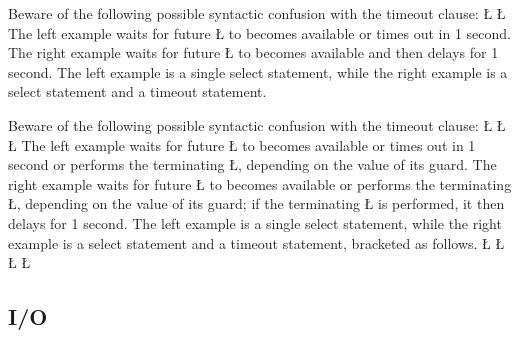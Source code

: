 \documentclass[openright,twoside]{report}
\begin{document}
\begin{annotation}
 Beware of the following possible syntactic confusion with the timeout clause:
\LGinlinefalse\LGbegin\lgrinde
\L{}
\L{}
\endlgrinde\LGend
The left example waits for future \LGinlinetrue\LGbegin\lgrinde\L{}\endlgrinde\LGend{} to becomes available or times out in 1 second.
The right example waits for future \LGinlinetrue\LGbegin\lgrinde\L{}\endlgrinde\LGend{} to becomes available and then delays for 1 second.
The left example is a single select statement, while the right example is a select statement and a timeout statement.
\end{annotation}

\begin{annotation}
 Beware of the following possible syntactic confusion with the timeout clause:
\LGinlinefalse\LGbegin\lgrinde
\L{}
\L{}
\L{}
\endlgrinde\LGend
The left example waits for future \LGinlinetrue\LGbegin\lgrinde\L{}\endlgrinde\LGend{} to becomes available or times out in 1 second or performs the terminating \LGinlinetrue\LGbegin\lgrinde\L{}\endlgrinde\LGend{}, depending on the value of its guard.
The right example waits for future \LGinlinetrue\LGbegin\lgrinde\L{}\endlgrinde\LGend{} to becomes available or performs the terminating \LGinlinetrue\LGbegin\lgrinde\L{}\endlgrinde\LGend{}, depending on the value of its guard;
if the terminating \LGinlinetrue\LGbegin\lgrinde\L{}\endlgrinde\LGend{} is performed, it then delays for 1 second.
The left example is a single select statement, while the right example is a select statement and a timeout statement, bracketed as follows.
\LGinlinefalse\LGbegin\lgrinde
\L{}
\L{}
\L{\LB{}}
\L{\LB{\}}}
\endlgrinde\LGend
\end{annotation}


\subsection{I/O}
\label{s:IOTimeout}
\end{document}
